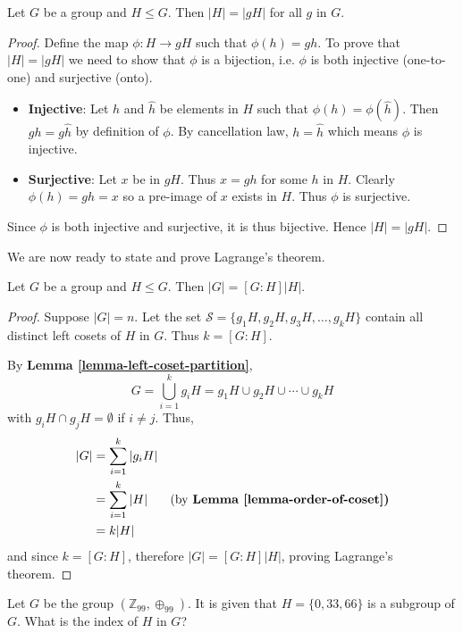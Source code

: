 \begin{lemma}\label{lemma-order-of-coset}
    Let $G$ be a group and $H \leq G$. Then $|H| = |gH|$ for all $g$ in $G$.
\end{lemma}
\begin{proof}
    Define the map $\phi: H \to gH$ such that $\phi(h) = gh$. To prove that $|H| = |gH|$ we need to show that $\phi$ is a bijection, i.e. $\phi$ is both injective (one-to-one) and surjective (onto).
    \begin{itemize}
        \item \textbf{Injective}: Let $h$ and $\hat{h}$ be elements in $H$ such that $\phi(h) = \phi(\hat{h})$. Then $gh = g\hat{h}$ by definition of $\phi$. By cancellation law, $h = \hat{h}$ which means $\phi$ is injective.
        \item \textbf{Surjective}: Let $x$ be in $gH$. Thus $x = gh$ for some $h$ in $H$. Clearly $\phi(h) = gh = x$ so a pre-image of $x$ exists in $H$. Thus $\phi$ is surjective.
    \end{itemize}
    Since $\phi$ is both injective and surjective, it is thus bijective. Hence $|H| = |gH|$.
\end{proof}

We are now ready to state and prove Lagrange's theorem.
\begin{theorem}[Lagrange]\label{thrm-lagrange}
    Let $G$ be a group and $H \leq G$. Then $|G| = [G:H]|H|$.
\end{theorem}
\begin{proof}
    Suppose $|G| = n$. Let the set $\mathcal{S} = \{g_1H, g_2H, g_3H, \dots, g_kH\}$ contain all distinct left cosets of $H$ in $G$. Thus $k = [G: H]$.

    By \textbf{Lemma \ref{lemma-left-coset-partition}},
    \[
        G = \bigcup_{i=1}^k g_iH = g_1H \cup g_2H \cup \cdots \cup g_kH
    \]
    with $g_iH \cap g_jH = \emptyset$ if $i \neq j$. Thus,
    \begin{align*}
        |G| &= \sum_{i=1}^k|g_iH|\\
        &=\sum_{i=1}^k|H| & \text{(by \textbf{Lemma \ref{lemma-order-of-coset})}}\\
        &= k|H|
    \end{align*}
    and since $k = [G: H]$, therefore $|G| = [G:H]|H|$, proving Lagrange's theorem.
\end{proof}

\begin{exercise}
    Let $G$ be the group $(\mathbb{Z}_{99}, \oplus_{99})$. It is given that $H = \{0, 33, 66\}$ is a subgroup of $G$. What is the index of $H$ in $G$?
\end{exercise}


